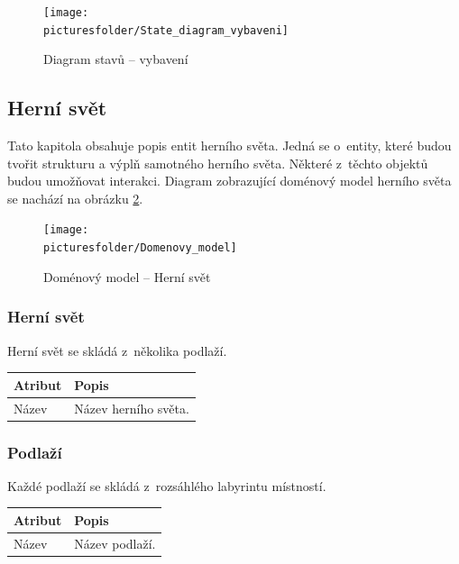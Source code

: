 \documentclass[12pt,a4paper]{article}
\def\picturesfolder{obrazky}
\begin{document}
\begin{figure}
\begin{center}
  \texttt{[image: \\picturesfolder/State\_diagram\_vybaveni]}
  \caption{Diagram stavů -- vybavení}
  \label{stavy:vybaveni}
\end{center}
\end{figure}

\subsection{Herní svět}
Tato kapitola obsahuje popis entit herního světa. Jedná se o~entity, které budou
tvořit strukturu a výplň samotného herního světa. Některé z~těchto objektů budou
umožňovat interakci.  Diagram zobrazující doménový model herního světa se
nachází na obrázku \ref{domenovy:hra}.

\begin{figure}
\begin{center}
  \texttt{[image: \\picturesfolder/Domenovy\_model]}
  \caption{Doménový model -- Herní svět}
  \label{domenovy:hra}
\end{center}
\end{figure}

\subsubsection{Herní svět}
Herní svět se skládá z~několika podlaží.

\noindent
\begin{tabularx}{\textwidth}{|l|>{\raggedright}X|}
\hline
\cellcolor{black!80}\textcolor{gray!25}{\textbf{Atribut}} & \cellcolor{black!80}\textcolor{gray!20}{\textbf{Popis}}\tabularnewline \hline
 Název & Název herního světa.
\tabularnewline\hline
\end{tabularx}

\subsubsection{Podlaží}
Každé podlaží se skládá z~rozsáhlého labyrintu místností.

\noindent
\begin{tabularx}{\textwidth}{|l|>{\raggedright}X|}
\hline
\cellcolor{black!80}\textcolor{gray!25}{\textbf{Atribut}} & \cellcolor{black!80}\textcolor{gray!20}{\textbf{Popis}}\tabularnewline \hline
 Název & Název podlaží.
\tabularnewline\hline
\end{tabularx}
\end{document}
